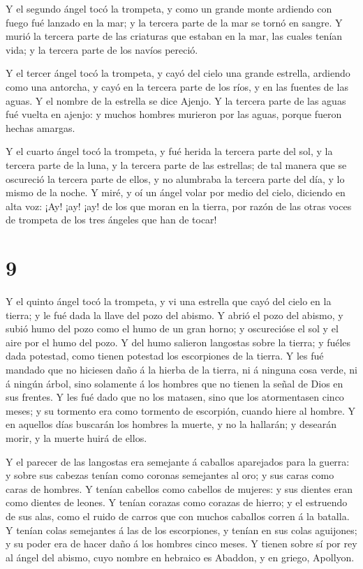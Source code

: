  Y el segundo ángel tocó la trompeta, y como un grande monte
ardiendo con fuego fué lanzado en la mar; y la tercera parte de la mar
se tornó en sangre.  Y murió la tercera parte de las
criaturas que estaban en la mar, las cuales tenían vida; y la tercera
parte de los navíos pereció.

 Y el tercer ángel tocó la trompeta, y cayó del cielo una
grande estrella, ardiendo como una antorcha, y cayó en la tercera parte
de los ríos, y en las fuentes de las aguas.  Y el nombre de
la estrella se dice Ajenjo. Y la tercera parte de las aguas fué vuelta
en ajenjo: y muchos hombres murieron por las aguas, porque fueron hechas
amargas.

 Y el cuarto ángel tocó la trompeta, y fué herida la
tercera parte del sol, y la tercera parte de la luna, y la tercera parte
de las estrellas; de tal manera que se oscureció la tercera parte de
ellos, y no alumbraba la tercera parte del día, y lo mismo de la noche.
 Y miré, y oí un ángel volar por medio del cielo, diciendo
en alta voz: ¡Ay! ¡ay! ¡ay! de los que moran en la tierra, por razón de
las otras voces de trompeta de los tres ángeles que han de tocar!

\hypertarget{section-8}{%
\section{9}\label{section-8}}

 Y el quinto ángel tocó la trompeta, y vi una estrella que
cayó del cielo en la tierra; y le fué dada la llave del pozo del abismo.
 Y abrió el pozo del abismo, y subió humo del pozo como el
humo de un gran horno; y oscurecióse el sol y el aire por el humo del
pozo.  Y del humo salieron langostas sobre la tierra; y
fuéles dada potestad, como tienen potestad los escorpiones de la tierra.
 Y les fué mandado que no hiciesen daño á la hierba de la
tierra, ni á ninguna cosa verde, ni á ningún árbol, sino solamente á los
hombres que no tienen la señal de Dios en sus frentes.  Y
les fué dado que no los matasen, sino que los atormentasen cinco meses;
y su tormento era como tormento de escorpión, cuando hiere al hombre.
 Y en aquellos días buscarán los hombres la muerte, y no la
hallarán; y desearán morir, y la muerte huirá de ellos.

 Y el parecer de las langostas era semejante á caballos
aparejados para la guerra: y sobre sus cabezas tenían como coronas
semejantes al oro; y sus caras como caras de hombres.  Y
tenían cabellos como cabellos de mujeres: y sus dientes eran como
dientes de leones.  Y tenían corazas como corazas de hierro;
y el estruendo de sus alas, como el ruido de carros que con muchos
caballos corren á la batalla.  Y tenían colas semejantes á
las de los escorpiones, y tenían en sus colas aguijones; y su poder era
de hacer daño á los hombres cinco meses.  Y tienen sobre sí
por rey al ángel del abismo, cuyo nombre en hebraico es Abaddon, y en
griego, Apollyon.

